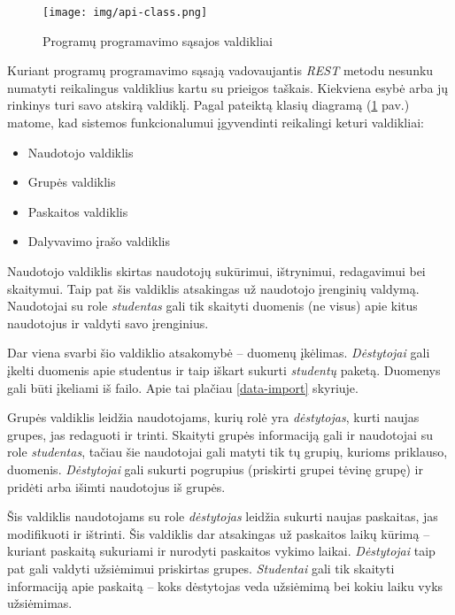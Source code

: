 \documentclass{VUMIFPSbakalaurinis}
\begin{document}
\begin{figure}[H]
	\centering
	\texttt{[image: img/api-class.png]}
	\caption{Programų programavimo sąsajos valdikliai}
	\label{img:api-class-diagram}
\end{figure}

Kuriant programų programavimo sąsają vadovaujantis \textit{REST} metodu nesunku numatyti reikalingus valdiklius kartu su prieigos taškais. Kiekviena esybė arba jų rinkinys turi savo atskirą valdiklį. Pagal pateiktą klasių diagramą (\ref{img:api-class-diagram} pav.) matome, kad sistemos funkcionalumui įgyvendinti reikalingi keturi valdikliai:

\begin{itemize}
    \item Naudotojo valdiklis
    \item Grupės valdiklis
    \item Paskaitos valdiklis
    \item Dalyvavimo įrašo valdiklis
\end{itemize}


Naudotojo valdiklis skirtas naudotojų sukūrimui, ištrynimui, redagavimui bei skaitymui. Taip pat šis valdiklis atsakingas už naudotojo įrenginių valdymą. Naudotojai su role \textit{studentas} gali tik skaityti duomenis (ne visus) apie kitus naudotojus ir valdyti savo įrenginius.

Dar viena svarbi šio valdiklio atsakomybė – duomenų įkėlimas. \textit{Dėstytojai} gali įkelti duomenis apie studentus ir taip iškart sukurti \textit{studentų} paketą. Duomenys gali būti įkeliami iš failo. Apie tai plačiau \ref{data-import} skyriuje.


Grupės valdiklis leidžia naudotojams, kurių rolė yra \textit{dėstytojas}, kurti naujas grupes, jas redaguoti ir trinti. Skaityti grupės informaciją gali ir naudotojai su role \textit{studentas}, tačiau šie naudotojai gali matyti tik tų grupių, kurioms priklauso, duomenis. \textit{Dėstytojai} gali sukurti pogrupius (priskirti grupei tėvinę grupę) ir pridėti arba išimti naudotojus iš grupės.


Šis valdiklis naudotojams su role \textit{dėstytojas} leidžia sukurti naujas paskaitas, jas modifikuoti ir ištrinti. Šis valdiklis dar atsakingas už paskaitos laikų kūrimą – kuriant paskaitą sukuriami ir nurodyti paskaitos vykimo laikai. \textit{Dėstytojai} taip pat gali valdyti užsiėmimui priskirtas grupes. \textit{Studentai} gali tik skaityti informaciją apie paskaitą – koks dėstytojas veda užsiėmimą bei kokiu laiku vyks užsiėmimas.
\end{document}
